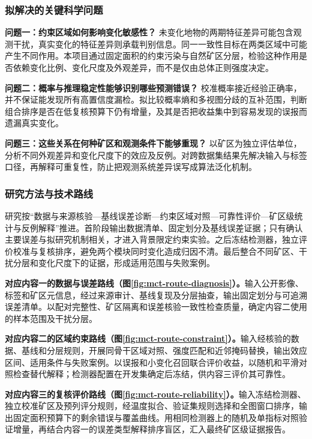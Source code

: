 \subsubsection{拟解决的关键科学问题}
\textbf{问题一：约束区域如何影响变化敏感性？}
未变化地物的两期特征差异可能包含观测干扰，真实变化的特征差异则承载判别信息。同一一致性目标在两类区域中可能产生不同作用。本项目通过固定面积的约束污染与自然矿区分层，检验这种作用是否依赖变化比例、变化尺度及外观差异，而不是仅由总体正则强度决定。

\textbf{问题二：概率与推理稳定性能够识别哪些预测错误？}
校准概率接近经验正确率，并不保证能发现所有高置信度漏检。拟比较概率熵和多视图分歧的互补范围，判断组合排序是否在低复核预算下仍有增量，及其是否把收益集中到容易发现的误报而遗漏真实变化。

\textbf{问题三：这些关系在何种矿区和观测条件下能够重现？}
以矿区为独立评估单位，分析不同外观差异和变化尺度下的效应及反例。对跨数据集结果先解决输入与标签口径，再解释可重复性，防止把观测系统差异误写成算法泛化机制。

\subsubsection{研究方法与技术路线}
研究按“数据与来源核验—基线误差诊断—约束区域对照—可靠性评价—矿区级统计与反例解释”推进。首阶段输出数据清单、固定划分及基线误差证据；只有确认主要误差与拟研究机制相关，才进入背景限定约束实验。之后冻结检测器，独立评价校准与复核排序，避免两个模块同时变化造成归因不清。最后整合不同矿区、干扰分层和变化尺度下的证据，形成适用范围与失败案例。

\textbf{对应内容一的数据与误差路线（图\ref{fig:mct-route-diagnosis}）。}输入公开影像、标签和矿区元信息，经过来源审计、基线复现及分层抽查，输出固定划分与可追溯误差清单。以配对完整性、矿区隔离和误差核验一致性检查质量，确定内容二使用的样本范围及干扰分层。

\textbf{对应内容二的区域约束路线（图\ref{fig:mct-route-constraint}）。}输入经核验的数据、基线和分层规则，开展同骨干区域对照、强度匹配和近邻掩码替换，输出效应区间、适用条件与失败案例。以误报和小变化召回联合评价收益，以随机和平滑对照检查替代解释；检测器配置在开发集确定后冻结，供内容三评价其可靠性。

\textbf{对应内容三的复核评价路线（图\ref{fig:mct-route-reliability}）。}输入冻结检测器、独立校准矿区及预列评分规则，经温度拟合、验证集规则选择和全图窗口排序，输出固定面积预算下的剩余错误与覆盖曲线。用相同检测器上的随机及单指标对照验证增量，再结合内容一的误差类型解释排序盲区，汇入最终矿区级证据报告。

